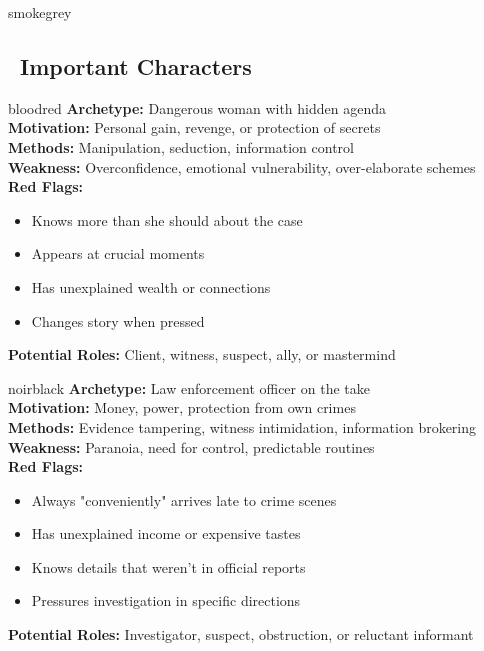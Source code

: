 \documentclass[11pt]{article}
\begin{document}
\begin{noirsection}{smokegrey}
\subsection*{\faUsers\ Important Characters}

\begin{suspectbox}{bloodred}
\textbf{Archetype:} Dangerous woman with hidden agenda\\
\textbf{Motivation:} Personal gain, revenge, or protection of secrets\\
\textbf{Methods:} Manipulation, seduction, information control\\
\textbf{Weakness:} Overconfidence, emotional vulnerability, over-elaborate schemes\\
\textbf{Red Flags:} 
\begin{itemize}
    \item Knows more than she should about the case
    \item Appears at crucial moments
    \item Has unexplained wealth or connections
    \item Changes story when pressed
\end{itemize}
\textbf{Potential Roles:} Client, witness, suspect, ally, or mastermind
\end{suspectbox}

\begin{suspectbox}{noirblack}
\textbf{Archetype:} Law enforcement officer on the take\\
\textbf{Motivation:} Money, power, protection from own crimes\\
\textbf{Methods:} Evidence tampering, witness intimidation, information brokering\\
\textbf{Weakness:} Paranoia, need for control, predictable routines\\
\textbf{Red Flags:}
\begin{itemize}
    \item Always "conveniently" arrives late to crime scenes
    \item Has unexplained income or expensive tastes
    \item Knows details that weren't in official reports
    \item Pressures investigation in specific directions
\end{itemize}
\textbf{Potential Roles:} Investigator, suspect, obstruction, or reluctant informant
\end{suspectbox}


\end{noirsection}
\end{document}
